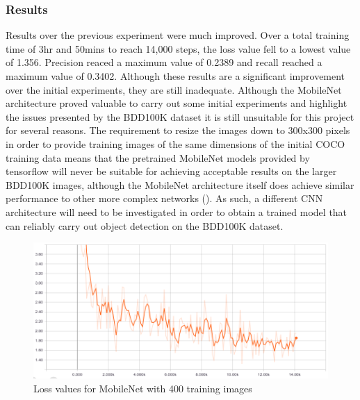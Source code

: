 \documentclass[12pt]{report}
\begin{document}
\subsubsection*{Results}
\begin{flushleft}
Results over the previous experiment were much improved. Over a total training time of 3hr and 50mins to reach 14,000 steps, the loss value fell to a lowest value of 1.356. Precision reaced a maximum value of 0.2389 and recall reached a maximum value of 0.3402. Although these results are a significant improvement over the initial experiments, they are still inadequate. Although the MobileNet architecture proved valuable to carry out some initial experiments and highlight the issues presented by the BDD100K dataset it is still unsuitable for this project for several reasons. The requirement to resize the images down to 300x300 pixels in order to provide training images of the same dimensions of the initial COCO training data means that the pretrained MobileNet models provided by tensorflow will never be suitable for achieving acceptable results on the larger BDD100K images, although the MobileNet architecture itself does achieve similar performance to other more complex networks (\cite{howard2017mobilenets}). As such, a different CNN architecture will need to be investigated in order to obtain a trained model that can reliably carry out object detection on the BDD100K dataset.
\end{flushleft}

\vspace{0.5cm}
\begin{figure}[ht!]
	\centering
	\includegraphics[width=15cm]{loss-mobilenet-2}
	\caption{Loss values for MobileNet with 400 training images}
	\label{fig:loss-mobilenet-2}
\end{figure}
\end{document}
